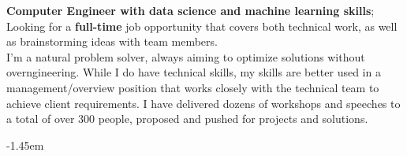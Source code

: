 \documentclass[10pt,a4paper,ragged2e]{altacv}
\begin{document}



\begin{fullwidth}
  \makecvheader

  \textbf{Computer Engineer with data science and machine learning skills}; Looking for a \textbf{full-time} job opportunity that covers both technical work, as well as brainstorming ideas with team members.\\
  I'm a natural problem solver, always aiming to optimize solutions without overngineering. While I do have technical skills, my skills are better used in a management/overview position that works closely with the technical team to achieve client requirements.
  \smallskip
  I have delivered dozens of workshops and speeches to a total of over 300 people, proposed and pushed for projects and solutions.

\end{fullwidth}



{}
\kern-1.45em %


\verbose{}{} %% "strenghts" section will only appear when verbose

\end{document}
